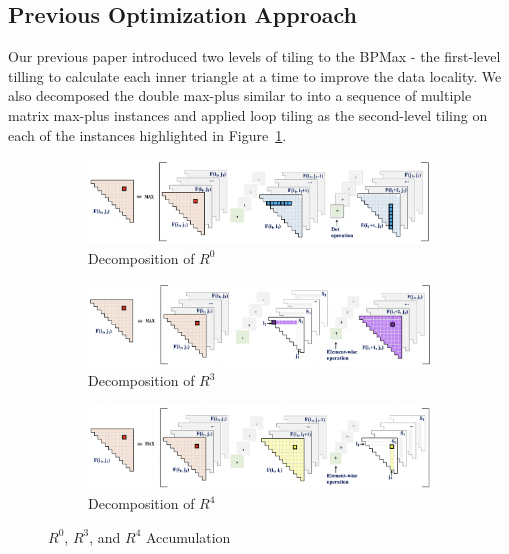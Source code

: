 \subsection{Previous Optimization Approach} Our previous paper \cite{Mondal2021} introduced two levels of tiling to the BPMax - the first-level tilling to calculate each inner triangle at a time to improve the data locality. We also decomposed the double max-plus similar to \cite{Varadarajan2016} into a sequence of multiple matrix max-plus instances and applied loop tiling as the second-level tiling on each of the instances highlighted in Figure~\ref{fig:double_max_plus_accumulation_sequence_0}.
\begin{figure}[htbp]
\centering
\begin{subfigure}[b]{0.48\textwidth}
\centering
\includegraphics[scale=0.30, trim=4 4 4 4,clip]{content/figures/r0_1.png}
\caption{Decomposition of $R^{0}$}
\label{fig:double_max_plus_accumulation_sequence_0}
\end{subfigure}
\begin{subfigure}[b]{0.48\textwidth}
\vspace{1mm}
\centering
\includegraphics[scale=0.30, trim=4 4 4 4,clip]{content/figures/r3_1.png}
\caption{Decomposition of $R^{3}$}
\label{fig:R_3_optimization}
\end{subfigure}
\begin{subfigure}[b]{0.48\textwidth}
\vspace{1mm}
\centering
\includegraphics[scale=0.30, trim=4 4 4 4,clip]{content/figures/r4_1.png}
\caption{Decomposition of $R^{4}$}
\label{fig:R_4_optimization}
\end{subfigure}
\caption{$R^{0}$, $R^{3}$, and $R^{4}$ Accumulation}
\label{fig:bpm_outer_accumulation_sequence}
\end{figure}
